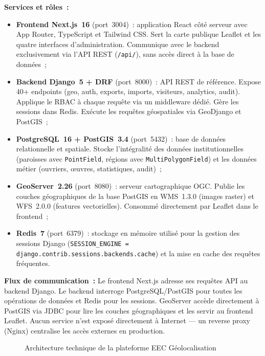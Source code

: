 \documentclass[12pt, a4paper]{report}
\begin{document}
\noindent\textbf{Services et rôles~:}
\begin{itemize}[itemsep=2pt, topsep=4pt, leftmargin=1.5cm]
  \item \textbf{Frontend Next.js~16} (port~3004)~: application React côté
    serveur avec App Router, TypeScript et Tailwind CSS. Sert la carte publique
    Leaflet et les quatre interfaces d'administration. Communique avec le backend
    exclusivement via l'API REST (\texttt{/api/}), sans accès direct à la base
    de données~;
  \item \textbf{Backend Django~5 + DRF} (port~8000)~: API REST de référence.
    Expose 40+ endpoints (geo, auth, exports, imports, visiteurs, analytics,
    audit). Applique le RBAC à chaque requête via un middleware dédié. Gère les
    sessions dans Redis. Exécute les requêtes géospatiales via GeoDjango et
    PostGIS~;
  \item \textbf{PostgreSQL~16 + PostGIS~3.4} (port~5432)~: base de données
    relationnelle et spatiale. Stocke l'intégralité des données institutionnelles
    (paroisses avec \texttt{PointField}, régions avec \texttt{MultiPolygonField})
    et les données métier (ouvriers, œuvres, statistiques, audit)~;
  \item \textbf{GeoServer~2.26} (port~8080)~: serveur cartographique OGC. Publie
    les couches géographiques de la base PostGIS en WMS~1.3.0 (images raster)
    et WFS~2.0.0 (features vectorielles). Consommé directement par Leaflet dans
    le frontend~;
  \item \textbf{Redis~7} (port~6379)~: stockage en mémoire utilisé pour la
    gestion des sessions Django (\texttt{SESSION\_ENGINE =
    django.contrib.sessions.backends.cache}) et la mise en cache des requêtes
    fréquentes.
\end{itemize}

\noindent\textbf{Flux de communication~:} Le frontend Next.js adresse ses
requêtes API au backend Django. Le backend interroge PostgreSQL/PostGIS pour
toutes les opérations de données et Redis pour les sessions. GeoServer accède
directement à PostGIS via JDBC pour lire les couches géographiques et les
servir au frontend Leaflet. Aucun service n'est exposé directement à Internet
--- un reverse proxy (Nginx) centralise les accès externes en production.

\begin{figure}[htbp]
  \centering
  \caption{Architecture technique de la plateforme EEC Géolocalisation}
  \label{fig:diag-archi}
\end{figure}
\end{document}
